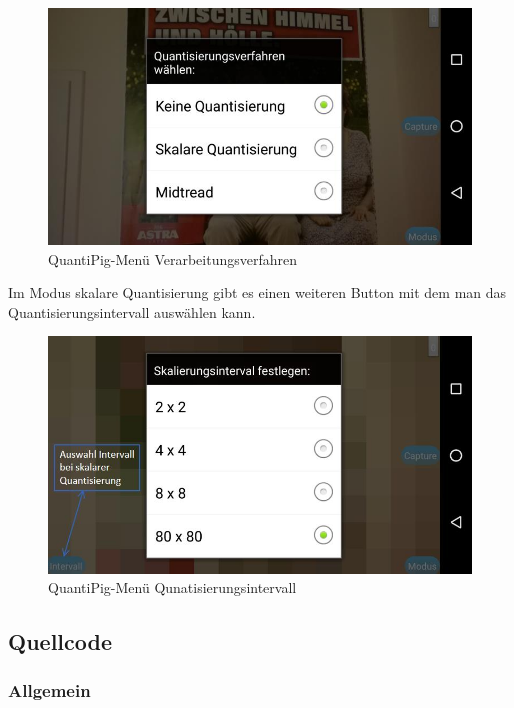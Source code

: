 \begin{figure}[h!]
	\centering
		\includegraphics[width=1.0\textwidth]{img/Verfahren_QuantiPig.jpg}
	\caption[QuantiPig-Menü Verarbeitungsverfahren]{QuantiPig-Menü Verarbeitungsverfahren}
	\label{fig:pig_verfahren}
\end{figure}

Im Modus skalare Quantisierung gibt es einen weiteren Button mit dem man das Quantisierungsintervall auswählen kann.

\begin{figure}[h!]
	\centering
		\includegraphics[width=1.0\textwidth]{img/Intervall_QuantiPig.jpg}
	\caption[QuantiPig-Menü Qunatisierungsintervall]{QuantiPig-Menü Qunatisierungsintervall}
	\label{fig:pig_intervall}
\end{figure}


\clearpage

\newpage
\subsection{Quellcode}
\subsubsection{Allgemein}

